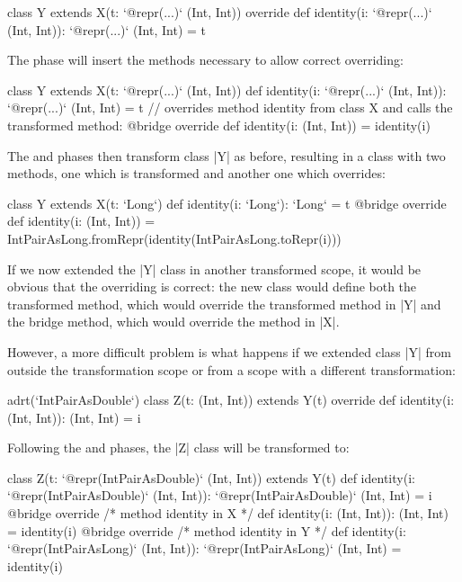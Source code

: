 \begin{lstlisting-nobreak}
class Y extends X(t: `@repr(...)` (Int, Int)) {
  override def identity(i: `@repr(...)` (Int, Int)): `@repr(...)` (Int, Int) = t
}
\end{lstlisting-nobreak}

The \bridge{} phase will insert the methods necessary to allow correct overriding:

\begin{lstlisting-nobreak}
class Y extends X(t: `@repr(...)` (Int, Int)) {
  def identity(i: `@repr(...)` (Int, Int)): `@repr(...)` (Int, Int) = t
  // overrides method identity from class X and calls the transformed method:
  @bridge override def identity(i: (Int, Int)) = identity(i)
}
\end{lstlisting-nobreak}

The \coerce{} and \commit{} phases then transform class |Y| as before, resulting in a class with two methods, one which is transformed and another one which overrides:

\begin{lstlisting-nobreak}
class Y extends X(t: `Long`) {
  def identity(i: `Long`): `Long` = t
  @bridge override def identity(i: (Int, Int)) =
    IntPairAsLong.fromRepr(identity(IntPairAsLong.toRepr(i)))
}
\end{lstlisting-nobreak}

If we now extended the |Y| class in another transformed scope, it would be obvious that the overriding is correct: the new class would define both the transformed method, which would override the transformed method in |Y| and the bridge method, which would override the method in |X|.

However, a more difficult problem is what happens if we extended class |Y| from outside the transformation scope or from a scope with a different transformation:

\begin{lstlisting-nobreak}
adrt(`IntPairAsDouble`) {
  class Z(t: (Int, Int)) extends Y(t) {
    override def identity(i: (Int, Int)): (Int, Int) = i
  }
}
\end{lstlisting-nobreak}

Following the \inject{} and \bridge{} phases, the |Z| class will be transformed to:

\begin{lstlisting-nobreak}
class Z(t: `@repr(IntPairAsDouble)` (Int, Int)) extends Y(t) {
  def identity(i: `@repr(IntPairAsDouble)` (Int, Int)): `@repr(IntPairAsDouble)` (Int, Int) = i
  @bridge override /* method identity in X */
  def identity(i: (Int, Int)): (Int, Int) = identity(i)
  @bridge override /* method identity in Y */
  def identity(i: `@repr(IntPairAsLong)` (Int, Int)): `@repr(IntPairAsLong)` (Int, Int) = identity(i)
}
\end{lstlisting-nobreak}

